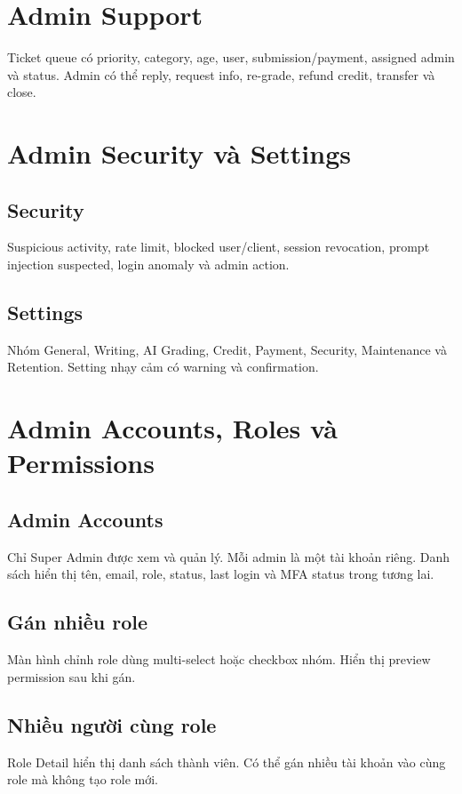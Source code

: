 \documentclass[11pt,a4paper]{article}
\begin{document}
\section{Admin Support}
Ticket queue có priority, category, age, user, submission/payment, assigned admin và status. Admin có thể reply, request info, re-grade, refund credit, transfer và close.

\section{Admin Security và Settings}

\subsection{Security}
Suspicious activity, rate limit, blocked user/client, session revocation, prompt injection suspected, login anomaly và admin action.

\subsection{Settings}
Nhóm General, Writing, AI Grading, Credit, Payment, Security, Maintenance và Retention. Setting nhạy cảm có warning và confirmation.

\section{Admin Accounts, Roles và Permissions}

\subsection{Admin Accounts}
Chỉ Super Admin được xem và quản lý. Mỗi admin là một tài khoản riêng. Danh sách hiển thị tên, email, role, status, last login và MFA status trong tương lai.

\subsection{Gán nhiều role}
Màn hình chỉnh role dùng multi-select hoặc checkbox nhóm. Hiển thị preview permission sau khi gán.

\subsection{Nhiều người cùng role}
Role Detail hiển thị danh sách thành viên. Có thể gán nhiều tài khoản vào cùng role mà không tạo role mới.
\end{document}
